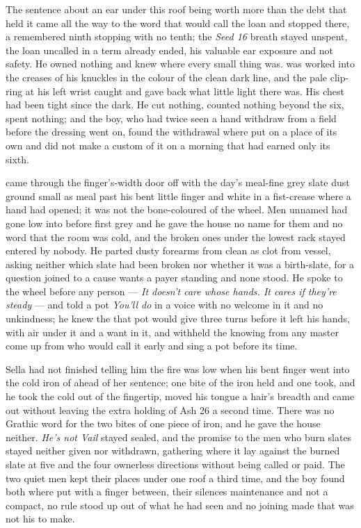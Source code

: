 The sentence about an ear under this roof being worth more than the debt that held it came all the way to the word that would call the loan and stopped there, a remembered ninth stopping with no tenth; the \emph{Seed 16} breath stayed unspent, the loan uncalled in a term already ended, his valuable ear exposure and not safety. He owned nothing and knew where every small thing was.  was worked into the creases of his knuckles in the colour of the clean dark line, and the pale clip-ring at his left wrist caught and gave back what little light there was. His chest had been tight since the dark. He cut nothing, counted nothing beyond the six, spent nothing; and the boy, who had twice seen a hand withdraw from a field before the dressing went on, found the withdrawal where put on a place of its own and did not make a custom of it on a morning that had earned only its sixth.

 came through the finger's-width door off  with the day's meal-fine grey slate dust ground small as meal past his bent little finger and white in a fist-crease where a hand had opened; it was not the bone-coloured  of the wheel. Men unnamed had gone low into  before first grey and he gave the house no name for them and no word that the room was cold, and the broken ones under the lowest rack stayed entered by nobody. He parted dusty forearms from clean as clot from vessel, asking neither which slate had been broken nor whether it was a birth-slate, for a question joined to a cause wants a payer standing and none stood. He spoke to the wheel before any person --- \emph{It doesn't care whose hands. It cares if they're steady} --- and told a pot \emph{You'll do} in a voice with no welcome in it and no unkindness; he knew the  that pot would give three turns before it left his hands, with air under it and a want in it, and withheld the knowing from any master come up from  who would call it early and sing a pot before its time.

Sella had not finished telling him the fire was low when his bent finger went into the cold iron of  ahead of her sentence; one bite of the iron held and one took, and he took the cold out of the fingertip, moved his tongue a hair's breadth and came out without leaving the extra holding of Ash 26 a second time. There was no Grathic word for the two bites of one piece of iron, and he gave the house neither. \emph{He's not Vail} stayed sealed, and the promise to the men who burn slates stayed neither given nor withdrawn, gathering where it lay against the burned slate at five and the four ownerless directions without being called or paid. The two quiet men kept their places under one roof a third time, and the boy found both where put with a finger between, their silences maintenance and not a compact, no rule stood up out of what he had seen and no joining made that was not his to make.

